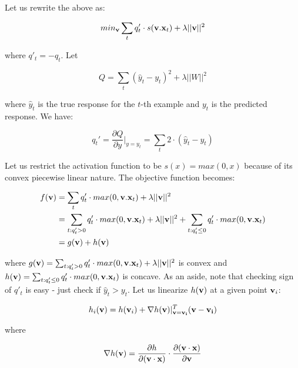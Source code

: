 \documentclass{article}
\begin{document}
Let us rewrite the above as:

\begin{equation}
min_{{\bf v}} \sum_{t} q'_t \cdot s({\bf v}.{\bf x}_t) + \lambda ||{\bf v}||^2
\end{equation}

where $q'_t = -q_t$. Let

\begin{equation}
Q = \sum_t (\hat{y}_t - y_t)^2 + \lambda ||W||^2
\end{equation}

where $\hat{y}_t$ is the true response for the $t$-th example and $y_t$ is the predicted response. We have:

\begin{equation}
q_t' =  \frac{\partial Q}{\partial y}|_{y = y_t} = \sum_t 2 \cdot (\hat{y}_t - y_t)
\end{equation}

Let us restrict the activation function to be $s(x) = max(0, x)$ because of its convex piecewise linear nature. The objective function becomes:

\begin{align}
f({\bf v}) &= \sum_{t} q'_t \cdot max(0, {\bf v}.{\bf x}_t) + \lambda ||{\bf v}||^2 \\
&= \sum_{t: q'_t > 0} q'_t \cdot max(0, {\bf v}.{\bf x}_t) + \lambda ||{\bf v}||^2 +  \sum_{t: q'_t \leq 0} q'_t \cdot max(0, {\bf v}.{\bf x}_t) \\
&= g({\bf v}) + h({\bf v})
\end{align}

where $g({\bf v}) = \sum_{t: q'_t > 0} q'_t \cdot max(0, {\bf v}.{\bf x}_t) + \lambda ||{\bf v}||^2 $ is convex and $h({\bf v}) = \sum_{t: q'_t \leq 0} q'_t \cdot max(0, {\bf v}.{\bf x}_t)$ is concave. As an aside, note that checking sign of $q'_t$ is easy - just check if $\hat{y}_t > y_t$. Let us linearize $h({\bf v})$ at a given point ${\bf v}_i$:

\begin{align}
h_i({\bf v})= h({\bf v}_i) + \nabla h({\bf v})|_{\bf v = v_i}^T ({\bf v} - {\bf v_i})
\end{align}

where

\begin{align}
\nabla h({\bf v}) &= \frac{\partial h}{\partial {\bf (v\cdot x)}} \cdot \frac{\partial{\bf (v\cdot x)}}{\partial {\bf v}} \\
\end{align}
\end{document}
